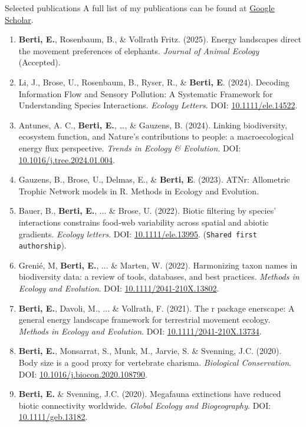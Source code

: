 \documentclass{resume} %
\begin{document}
\begin{rSection}{Selected publications}
A full list of my publications can be found at \href{https://scholar.google.com/citations?hl=en&user=5KPh-oUAAAAJ&view_op=list_works&sortby=pubdate}{Google Scholar}.

\begin{enumerate}
    \setlength\itemsep{-0.5em}
    \item \textbf{Berti, E.}, Rosenbaum, B., \& Vollrath Fritz. (2025). Energy landscapes direct the movement preferences of elephants. \textit{Journal of Animal Ecology} (Accepted). 
    \item Li, J., Brose, U., Rosenbaum, B., Ryser, R., \& \textbf{Berti, E}. (2024). Decoding Information Flow and Sensory Pollution: A Systematic Framework for Understanding Species Interactions. \textit{Ecology Letters}. DOI: \href{https://doi.org/10.1111/ele.14522}{10.1111/ele.14522}.
    \item Antunes, A. C., \textbf{Berti, E.}, \dots, \& Gauzens, B. (2024). Linking biodiversity, ecosystem function, and Nature’s contributions to people: a macroecological energy flux perspective. \textit{Trends in Ecology \& Evolution}. DOI: \href{https://doi.org/10.1016/j.tree.2024.01.004}{10.1016/j.tree.2024.01.004}.
    \item Gauzens, B., Brose, U., Delmas, E., \& \textbf{Berti, E}. (2023). ATNr: Allometric Trophic Network models in R. Methods in Ecology and Evolution.
    \item Bauer, B., \textbf{Berti, E.}, ... \& Brose, U. (2022). Biotic filtering by species’ interactions constrains food-web variability across spatial and abiotic gradients. \textit{Ecology letters}. DOI: \href{https://doi.org/10.1111/ele.13995}{10.1111/ele.13995}. (\texttt{Shared first authorship}).
    \item Grenié, M, \textbf{Berti, E.}, ... \& Marten, W. (2022). Harmonizing taxon names in biodiversity data: a review of tools, databases, and best practices. \textit{Methods in Ecology and Evolution}. DOI: \href{https://doi.org/10.1111/2041-210X.13802}{10.1111/2041-210X.13802}.
    \item \textbf{Berti, E.}, Davoli, M., ... \& Vollrath, F. (2021). The r package enerscape: A general energy landscape framework for terrestrial movement ecology. \textit{Methods in Ecology and Evolution}. DOI: \href{https://doi.org/10.1111/2041-210X.13734}{10.1111/2041-210X.13734}.
    \item \textbf{Berti, E.}, Monsarrat, S., Munk, M., Jarvie, S. \& Svenning, J.C. (2020). Body size is a good proxy for vertebrate charisma. \textit{Biological Conservation}. DOI: \href{https://doi.org/10.1016/j.biocon.2020.108790}{10.1016/j.biocon.2020.108790}.
    \item \textbf{Berti, E.} \& Svenning, J.C. (2020). Megafauna extinctions have reduced biotic connectivity worldwide. \textit{Global Ecology and Biogeography}. DOI: \href{https://doi.org/10.1111/geb.13182}{10.1111/geb.13182}.
\end{enumerate}
\end{rSection}
\end{document}

